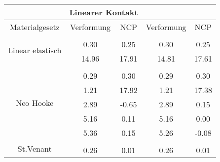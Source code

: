 \begin{table} 
\centering 
\begin{tabular}{c|cc|cc|} 
\cline{2-5} 
 & \multicolumn{2}{|c|}{Linearer Kontakt} &  \\ 
\hline 
\multicolumn{1}{|c|}{Materialgesetz} & \multicolumn{1}{c|}{Verformung} & \multicolumn{1}{c|}{NCP} & \multicolumn{1}{c|}{Verformung} & \multicolumn{1}{c|}{NCP} \\ 
\hline 
\multicolumn{1}{|c|}{\multirow{3}{*}{Linear elastisch}} &\multicolumn{1}{|c|}{} & \multicolumn{1}{|c|}{} & \multicolumn{1}{|c|}{} & \multicolumn{1}{|c|}{} \\ 
\multicolumn{1}{|c|}{} & \multicolumn{1}{|c|}{      0.30} & \multicolumn{1}{|c|}{      0.25} & \multicolumn{1}{|c|}{      0.30} & \multicolumn{1}{|c|}{      0.25} \\ 
\multicolumn{1}{|c|}{} & \multicolumn{1}{|c|}{     14.96} & \multicolumn{1}{|c|}{     17.91} & \multicolumn{1}{|c|}{     14.81} & \multicolumn{1}{|c|}{     17.61} \\ 
\hline 
\multicolumn{1}{|c|}{\multirow{6}{*}{Neo Hooke}} &\multicolumn{1}{|c|}{} & \multicolumn{1}{|c|}{} & \multicolumn{1}{|c|}{} & \multicolumn{1}{|c|}{} \\ 
\multicolumn{1}{|c|}{} & \multicolumn{1}{|c|}{      0.29} & \multicolumn{1}{|c|}{      0.30} & \multicolumn{1}{|c|}{      0.29} & \multicolumn{1}{|c|}{      0.30} \\ 
\multicolumn{1}{|c|}{} & \multicolumn{1}{|c|}{      1.21} & \multicolumn{1}{|c|}{     17.92} & \multicolumn{1}{|c|}{      1.21} & \multicolumn{1}{|c|}{     17.38} \\ 
\multicolumn{1}{|c|}{} & \multicolumn{1}{|c|}{      2.89} & \multicolumn{1}{|c|}{     -0.65} & \multicolumn{1}{|c|}{      2.89} & \multicolumn{1}{|c|}{      0.15} \\ 
\multicolumn{1}{|c|}{} & \multicolumn{1}{|c|}{      5.16} & \multicolumn{1}{|c|}{      0.11} & \multicolumn{1}{|c|}{      5.16} & \multicolumn{1}{|c|}{      0.00} \\ 
\multicolumn{1}{|c|}{} & \multicolumn{1}{|c|}{      5.36} & \multicolumn{1}{|c|}{      0.15} & \multicolumn{1}{|c|}{      5.26} & \multicolumn{1}{|c|}{     -0.08} \\ 
\hline 
\multicolumn{1}{|c|}{\multirow{6}{*}{St.Venant}} &\multicolumn{1}{|c|}{} & \multicolumn{1}{|c|}{} & \multicolumn{1}{|c|}{} & \multicolumn{1}{|c|}{} \\ 
\multicolumn{1}{|c|}{} & \multicolumn{1}{|c|}{      0.26} & \multicolumn{1}{|c|}{      0.01} & \multicolumn{1}{|c|}{      0.26} & \multicolumn{1}{|c|}{      0.01} \\ 

\end{tabular}
\end{table}
